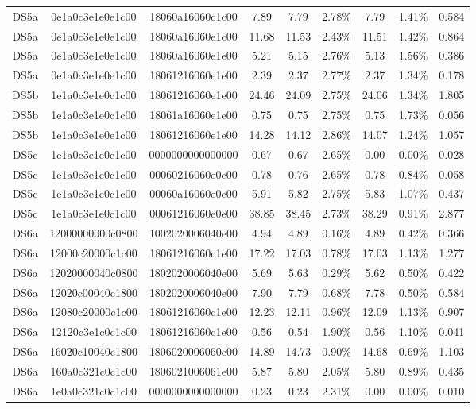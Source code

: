 \begin{tabular}{|c|c c|c|c c|c c|c|}
  DS5a & 0e1a0c3e1e0e1c00 & 18060a16060c1c00 & 7.89 & 7.79 & 2.78\% & 7.79 & 1.41\% & 0.584 \\
  DS5a & 0e1a0c3e1e0e1c00 & 18060a16060e1c00 & 11.68 & 11.53 & 2.43\% & 11.51 & 1.42\% & 0.864 \\
  DS5a & 0e1a0c3e1e0e1c00 & 18060a16060e1e00 & 5.21 & 5.15 & 2.76\% & 5.13 & 1.56\% & 0.386 \\
  DS5a & 0e1a0c3e1e0e1c00 & 18061216060e1e00 & 2.39 & 2.37 & 2.77\% & 2.37 & 1.34\% & 0.178 \\
  DS5b & 1e1a0c3e1e0c1c00 & 18061216060e1e00 & 24.46 & 24.09 & 2.75\% & 24.06 & 1.34\% & 1.805 \\
  DS5b & 1e1a0c3e1e0c1c00 & 18061a16060e1e00 & 0.75 & 0.75 & 2.75\% & 0.75 & 1.73\% & 0.056 \\
  DS5b & 1e1a0c3e1e0e1c00 & 18061216060e1e00 & 14.28 & 14.12 & 2.86\% & 14.07 & 1.24\% & 1.057 \\
  DS5c & 1e1a0c3e1e0c1c00 & 0000000000000000 & 0.67 & 0.67 & 2.65\% & 0.00 & 0.00\% & 0.028 \\
  DS5c & 1e1a0c3e1e0c1c00 & 00060216060e0e00 & 0.78 & 0.76 & 2.65\% & 0.78 & 0.84\% & 0.058 \\
  DS5c & 1e1a0c3e1e0c1c00 & 00060a16060e0e00 & 5.91 & 5.82 & 2.75\% & 5.83 & 1.07\% & 0.437 \\
  DS5c & 1e1a0c3e1e0c1c00 & 00061216060e0e00 & 38.85 & 38.45 & 2.73\% & 38.29 & 0.91\% & 2.877 \\
  DS6a & 12000000000c0800 & 1002020006040e00 & 4.94 & 4.89 & 0.16\% & 4.89 & 0.42\% & 0.366 \\
  DS6a & 12000c20000c1c00 & 18061216060c1e00 & 17.22 & 17.03 & 0.78\% & 17.03 & 1.13\% & 1.277 \\
  DS6a & 12020000040c0800 & 1802020006040e00 & 5.69 & 5.63 & 0.29\% & 5.62 & 0.50\% & 0.422 \\
  DS6a & 12020c00040c1800 & 1802020006040e00 & 7.90 & 7.79 & 0.68\% & 7.78 & 0.50\% & 0.584 \\
  DS6a & 12080c20000c1c00 & 18061216060c1e00 & 12.23 & 12.11 & 0.96\% & 12.09 & 1.13\% & 0.907 \\
  DS6a & 12120c3e1c0c1c00 & 18061216060c1e00 & 0.56 & 0.54 & 1.90\% & 0.56 & 1.10\% & 0.041 \\
  DS6a & 16020c10040c1800 & 1806020006060e00 & 14.89 & 14.73 & 0.90\% & 14.68 & 0.69\% & 1.103 \\
  DS6a & 160a0c321c0c1c00 & 1806021006061e00 & 5.87 & 5.80 & 2.05\% & 5.80 & 0.89\% & 0.435 \\
  DS6a & 1e0a0c321c0c1c00 & 0000000000000000 & 0.23 & 0.23 & 2.31\% & 0.00 & 0.00\% & 0.010 \\

\end{tabular}
